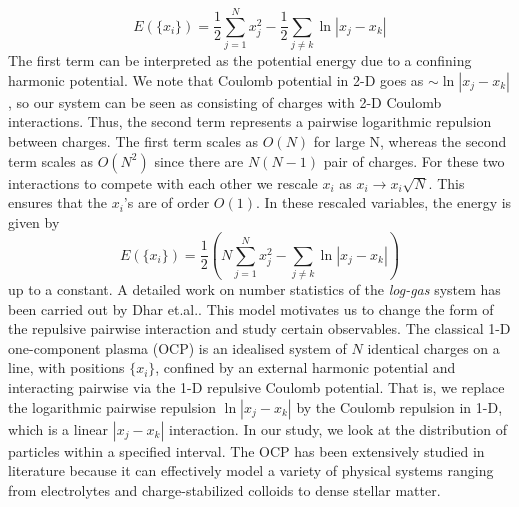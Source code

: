 \documentclass[11pt]{article}
\begin{document}
\begin{equation}
E(\{x_i\}) = \frac{1}{2}\sum_{j=1}^Nx_j^2-\frac{1}{2}\sum_{j\neq k}\ln|x_j-x_k|
\end{equation}
The first term can be interpreted as the potential energy due to a confining harmonic potential. We note that Coulomb potential in 2-D goes as $\sim\ln|x_j-x_k|$, so our system can be seen as consisting of charges with 2-D Coulomb interactions. Thus, the second term represents a pairwise logarithmic repulsion between charges. The first term scales as $O(N)$ for large N, whereas the second term scales as $O(N^2)$ since there are $N(N-1)$ pair of charges. For these two interactions to compete with each other we rescale $x_i$ as $x_i\to x_i\sqrt{N}$. This ensures that the $x_i$'s are of order $O(1)$. In these rescaled variables, the energy is given by
\begin{equation}
E(\{x_i\}) = \frac{1}{2}\left(N\sum_{j=1}^Nx_j^2-\sum_{j\neq k}\ln|x_j-x_k|\right)
\end{equation}
up to a constant. A detailed work on number statistics of the \textit{log-gas} system has been carried out by Dhar et.al.\cite{ref:dhar}. This model motivates us to change the form of the repulsive pairwise interaction and study certain observables. The classical 1-D one-component plasma (OCP) is an idealised system of $N$ identical charges on a line, with positions $\{x_i\}$, confined by an external harmonic potential and interacting pairwise via the 1-D repulsive Coulomb potential. That is, we replace the logarithmic pairwise repulsion $\ln|x_j-x_k|$ by the Coulomb repulsion in 1-D, which is a linear $|x_j-x_k|$ interaction. In our study, we look at the distribution of particles within a specified interval. The OCP has been extensively studied in literature because it can effectively model a variety of physical systems ranging from electrolytes and charge-stabilized colloids to dense stellar matter\cite{ref:oxford}. 
\end{document}
